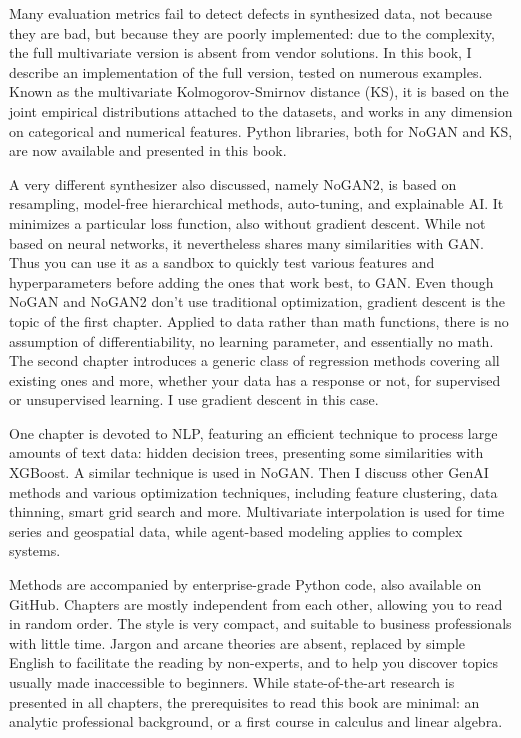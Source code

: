\documentclass[oneside,10pt]{book}
\begin{document}
Many evaluation metrics fail to detect defects in synthesized data, not because they are bad, but because
 they are poorly implemented: due to the complexity, the full multivariate version is absent from vendor solutions. In this book, I describe an implementation
 of the full version, tested on numerous examples. Known as the multivariate Kolmogorov-Smirnov distance (KS), it is based on the joint empirical distributions attached to the datasets, and works in any dimension on categorical and numerical features. Python libraries, both for NoGAN and KS, are now available and presented in this book.

A very different synthesizer also discussed,  namely NoGAN2, is based on resampling, model-free hierarchical methods, auto-tuning, and explainable AI. It minimizes a particular loss function, also without gradient descent. While not based on neural networks, it nevertheless shares many similarities with GAN. Thus you can use it as a sandbox to quickly test various features and hyperparameters before adding the ones that work best, to GAN.
Even though NoGAN and NoGAN2 don't use traditional optimization, gradient descent is the topic of the first chapter. Applied to data rather than math functions, there is no assumption of differentiability, no learning parameter, and essentially no math. The second chapter introduces a generic class of regression methods covering all existing ones and more, whether your data has a response or not, for supervised or unsupervised learning. I use gradient descent in this case.

One chapter is devoted to NLP, featuring an efficient technique to process large amounts of text data: hidden decision trees, presenting some similarities with XGBoost. A similar
 technique is used in NoGAN. Then I discuss other GenAI methods and various optimization techniques, including feature clustering, data thinning, smart grid search and more. Multivariate interpolation is used for time series and geospatial data, while agent-based modeling applies to complex systems.


Methods are accompanied by enterprise-grade Python code, also available on GitHub. Chapters are mostly independent from each other, allowing you to read in random order.
The style is very compact, and suitable to business professionals with little time. Jargon and arcane theories are absent, replaced by simple English to facilitate the reading by non-experts, and to help you discover topics usually made inaccessible to beginners.  While state-of-the-art research is presented in all chapters, the prerequisites to read this book are minimal: an analytic professional background, or a first course in calculus and linear algebra.
\end{document}
